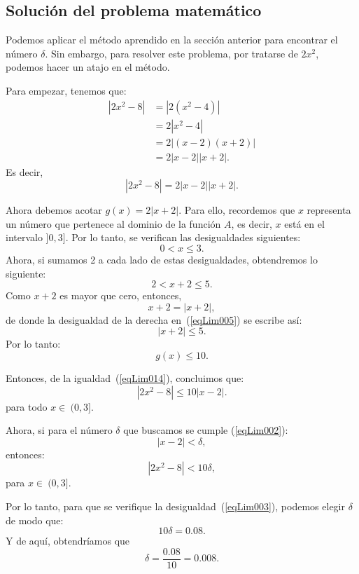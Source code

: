 \subsection{Solución del problema matemático}
Podemos aplicar el método aprendido en la sección anterior para encontrar el número $\delta$. Sin
embargo, para resolver este problema, por tratarse de $2x^2$, podemos hacer un atajo en el
método.

Para empezar, tenemos que:
\begin{align*}
|2x^2 - 8| &= |2(x^2 - 4)| \\
&= 2|x^2 - 4| \\
&= 2|(x - 2)(x + 2)| \\
&= 2|x-2||x+2|.
\end{align*}
Es decir,
\begin{equation}
\label{eqLim014}%
|2x^2 - 8| = 2|x-2||x+2|.
\end{equation}

Ahora debemos acotar $g(x) = 2|x+2|$. Para ello, recordemos que $x$ representa un número que
pertenece al dominio de la función $A$, es decir, $x$ está en el intervalo $]0,3]$. Por lo tanto,
se verifican las desigualdades siguientes:
\[
0 < x \leq 3.
\]
Ahora, si sumamos 2 a cada lado de estas desigualdades, obtendremos lo siguiente:
\begin{equation}
\label{eqLim005}%
2 < x + 2 \leq 5.
\end{equation}
Como $x + 2$ es mayor que cero, entonces,
\[
x + 2 = |x + 2|,
\]
de donde la desigualdad de la derecha en~(\ref{eqLim005}) se escribe así:
\begin{equation}
\label{eqLim006}%
|x + 2| \leq 5.
\end{equation}
Por lo tanto:
\[
g(x) \leq 10.
\]

Entonces, de la igualdad~(\ref{eqLim014}), concluimos que:
\begin{equation}
\label{eqLim007}%
|2x^2 - 8| \leq 10|x - 2|.
\end{equation}
para todo $x\in\ (0,3]$.

Ahora, si para el número $\delta$ que buscamos se cumple (\ref{eqLim002}):
\[
|x - 2| < \delta,
\]
entonces:
\begin{equation*}
|2x^2 - 8| < 10\delta,
\end{equation*}
para $x\in\ (0,3]$.

Por lo tanto, para que se verifique la desigualdad~(\ref{eqLim003}), podemos elegir $\delta$ de
modo que:
\[
10\delta = 0.08.
\]
Y de aquí, obtendríamos que
\[
\delta = \frac{0.08}{10} = 0.008.
\]

